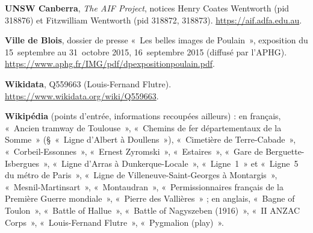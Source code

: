 \begin{biblist}
\item \textbf{UNSW Canberra}, \textit{The AIF Project}, notices Henry Coates Wentworth (pid 318876) et Fitzwilliam Wentworth (pid 318872, 318873). \url{https://aif.adfa.edu.au}.
\item \textbf{Ville de Blois}, dossier de presse «~Les belles images de Poulain~», exposition du 15~septembre au 31~octobre 2015, 16~septembre 2015 (diffusé par l'APHG). \url{https://www.aphg.fr/IMG/pdf/dpexpositionpoulain.pdf}.
\item \textbf{Wikidata}, Q559663 (Louis-Fernand Flutre). \url{https://www.wikidata.org/wiki/Q559663}.
\item \textbf{Wikipédia} (points d'entrée, informations recoupées ailleurs) : en français, «~Ancien tramway de Toulouse~», «~Chemins de fer départementaux de la Somme~» (§~«~Ligne d'Albert à Doullens~»), «~Cimetière de Terre-Cabade~», «~Corbeil-Essonnes~», «~Ernest Zyromski~», «~Estaires~», «~Gare de Berguette-Isbergues~», «~Ligne d'Arras à Dunkerque-Locale~», «~Ligne~1~» et «~Ligne~5 du métro de Paris~», «~Ligne de Villeneuve-Saint-Georges à Montargis~», «~Mesnil-Martinsart~», «~Montaudran~», «~Permissionnaires français de la Première Guerre mondiale~», «~Pierre des Vallières~» ; en anglais, «~Bagne of Toulon~», «~Battle of Hallue~», «~Battle of Nagyszeben (1916)~», «~II ANZAC Corps~», «~Louis-Fernand Flutre~», «~Pygmalion (play)~».
\end{biblist}

\endgroup
